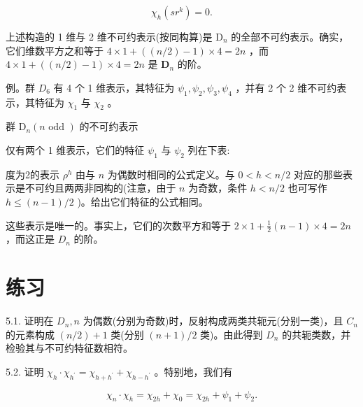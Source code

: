 \documentclass[10pt]{article}
\begin{document}
\[
{\chi }_{h}\left( {s{r}^{k}}\right)  = 0.
\]

上述构造的 1 维与 2 维不可约表示(按同构算)是 \({\mathrm{D}}_{n}\) 的全部不可约表示。确实，它们维数平方之和等于 \(4 \times  1 + \left( {\left( {n/2}\right)  - 1}\right)  \times  4 = {2n}\) ，而 \(4 \times  1 + \left( {\left( {n/2}\right)  - 1}\right)  \times  4 = {2n}\) 是 \({\mathbf{D}}_{n}\) 的阶。

例。群 \({D}_{6}\) 有 4 个 1 维表示，其特征为 \({\psi }_{1},{\psi }_{2},{\psi }_{3},{\psi }_{4}\) ，并有 2 个 2 维不可约表示，其特征为 \({\chi }_{1}\) 与 \({\chi }_{2}\) 。

群 \({\mathrm{D}}_{n}\left( {n\text{ odd }}\right)\) 的不可约表示

仅有两个 1 维表示，它们的特征 \({\psi }_{1}\) 与 \({\psi }_{2}\) 列在下表:

\begin{center}
\end{center}

度为2的表示 \({\rho }^{h}\) 由与 \(n\) 为偶数时相同的公式定义。与 \(0 < h < n/2\) 对应的那些表示是不可约且两两非同构的(注意，由于 \(n\) 为奇数，条件 \(h < n/2\) 也可写作 \(h \leq  \left( {n - 1}\right) /2\) )。给出它们特征的公式相同。

这些表示是唯一的。事实上，它们的次数平方和等于 \(2 \times  1 + \frac{1}{2}\left( {n - 1}\right)  \times  4 = {2n}\) ，而这正是 \({D}_{n}\) 的阶。

\section*{练习}

5.1. 证明在 \({D}_{n},n\) 为偶数(分别为奇数)时，反射构成两类共轭元(分别一类)，且 \({C}_{n}\) 的元素构成 \(\left( {n/2}\right)  + 1\) 类(分别 \(\left( {n + 1}\right) /2\) 类)。由此得到 \({D}_{n}\) 的共轭类数，并检验其与不可约特征数相符。

5.2. 证明 \({\chi }_{h} \cdot  {\chi }_{{h}^{\prime }} = {\chi }_{h + {h}^{\prime }} + {\chi }_{h - {h}^{\prime }}\) 。特别地，我们有

\[
{\chi }_{n} \cdot  {\chi }_{h} = {\chi }_{2h} + {\chi }_{0} = {\chi }_{2h} + {\psi }_{1} + {\psi }_{2}.
\]
\end{document}

